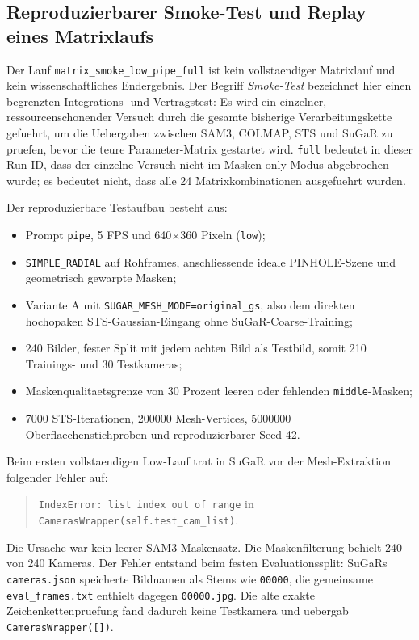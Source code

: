 \documentclass[12pt,a4paper]{article}
\begin{document}
\subsection*{Reproduzierbarer Smoke-Test und Replay eines Matrixlaufs}
Der Lauf \texttt{matrix\_smoke\_low\_pipe\_full} ist kein vollstaendiger
Matrixlauf und kein wissenschaftliches Endergebnis. Der Begriff
\emph{Smoke-Test} bezeichnet hier einen begrenzten Integrations- und
Vertragstest: Es wird ein einzelner, ressourcenschonender Versuch durch die
gesamte bisherige Verarbeitungskette gefuehrt, um die Uebergaben zwischen SAM3,
COLMAP, STS und SuGaR zu pruefen, bevor die teure Parameter-Matrix gestartet
wird. \texttt{full} bedeutet in dieser Run-ID, dass der einzelne Versuch nicht
im Masken-only-Modus abgebrochen wurde; es bedeutet nicht, dass alle 24
Matrixkombinationen ausgefuehrt wurden.

Der reproduzierbare Testaufbau besteht aus:
\begin{itemize}[noitemsep]
    \item Prompt \texttt{pipe}, 5 FPS und 640$\times$360 Pixeln (\texttt{low});
    \item \texttt{SIMPLE\_RADIAL} auf Rohframes, anschliessende ideale
        PINHOLE-Szene und geometrisch gewarpte Masken;
    \item Variante A mit \texttt{SUGAR\_MESH\_MODE=original\_gs}, also dem
        direkten hochopaken STS-Gaussian-Eingang ohne SuGaR-Coarse-Training;
    \item 240 Bilder, fester Split mit jedem achten Bild als Testbild,
        somit 210 Trainings- und 30 Testkameras;
    \item Maskenqualitaetsgrenze von 30 Prozent leeren oder fehlenden
        \texttt{middle}-Masken;
    \item 7000 STS-Iterationen, 200000 Mesh-Vertices, 5000000
        Oberflaechenstichproben und reproduzierbarer Seed 42.
\end{itemize}

Beim ersten vollstaendigen Low-Lauf trat in SuGaR vor der Mesh-Extraktion
folgender Fehler auf:
\begin{quote}
\texttt{IndexError: list index out of range} in
\texttt{CamerasWrapper(self.test\_cam\_list)}.
\end{quote}
Die Ursache war kein leerer SAM3-Maskensatz. Die Maskenfilterung behielt
240 von 240 Kameras. Der Fehler entstand beim festen Evaluationssplit: SuGaRs
\texttt{cameras.json} speicherte Bildnamen als Stems wie \texttt{00000}, die
gemeinsame \texttt{eval\_frames.txt} enthielt dagegen \texttt{00000.jpg}.
Die alte exakte Zeichenkettenpruefung fand dadurch keine Testkamera und
uebergab \texttt{CamerasWrapper([])}.
\end{document}
